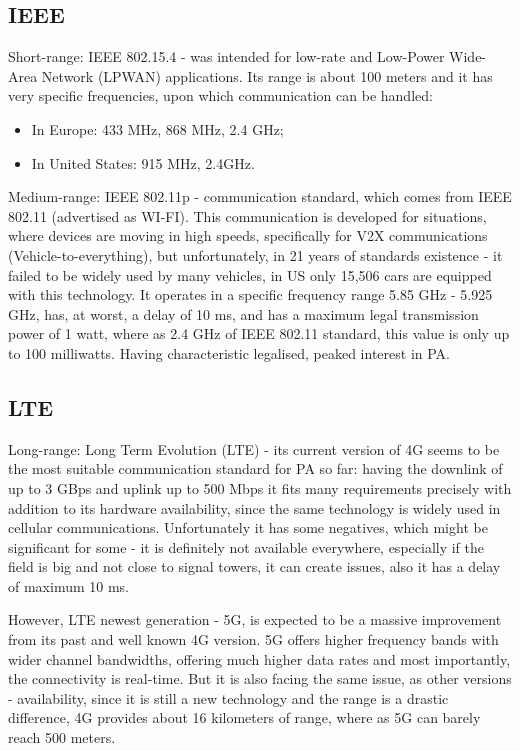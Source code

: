 \documentclass[11pt,a4paper,footinclude=true,headinclude=true, oneside]{scrbook}
\begin{document}
\subsection{IEEE}

Short-range: IEEE 802.15.4 - was intended for low-rate and Low-Power Wide-Area Network (LPWAN) applications. Its range is about 100 meters and it has very specific frequencies, upon which communication can be handled:

\begin{itemize}
    \item In Europe: 433 MHz, 868 MHz, 2.4 GHz;
    \item In United States: 915 MHz, 2.4GHz.
\end{itemize}

Medium-range: IEEE 802.11p - communication standard, which comes from IEEE 802.11 (advertised as WI-FI). This communication is developed for situations, where devices are moving in high speeds, specifically for V2X communications (Vehicle-to-everything), but unfortunately, in 21 years of standards existence - it failed to be widely used by many vehicles, in US only 15,506 cars are equipped with this technology. It operates in a specific frequency range 5.85 GHz - 5.925 GHz, has, at worst, a delay of 10 ms, and has a maximum legal transmission power of 1 watt, where as 2.4 GHz of IEEE 802.11 standard, this value is only up to 100 milliwatts. Having characteristic legalised, peaked interest in PA.

\subsection{LTE}

Long-range: Long Term Evolution (LTE) - its current version of 4G seems to be the most suitable communication standard for PA so far: having the downlink of up to 3 GBps and uplink up to 500 Mbps it fits many requirements precisely with addition to its hardware availability, since the same technology is widely used in cellular communications. Unfortunately it has some negatives, which might be significant for some - it is definitely not available everywhere, especially if the field is big and not close to signal towers, it can create issues, also it has a delay of maximum 10 ms.

However, LTE newest generation - 5G, is expected to be a massive improvement from its past and well known 4G version. 5G offers higher frequency bands with wider channel bandwidths, offering much higher data rates and most importantly, the connectivity is real-time. But it is also facing the same issue, as other versions - availability, since it is still a new technology and the range is a drastic difference, 4G provides about 16 kilometers of range, where as 5G can barely reach 500 meters.
\end{document}
